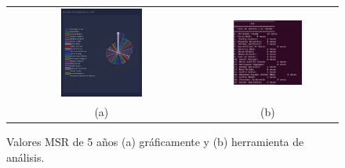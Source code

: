 \documentclass[a4paper, 12pt]{book}
\begin{document}
\begin{figure}[!h]
    \centering
    \begin{tabular}{cc}
    \includegraphics[width=0.45\textwidth]{img/msr_5_year_graph.png} &  
    \includegraphics[width=0.52\textwidth]{img/msr_5_year.png} \\ 
    (a) &(b) 
    \end{tabular}
    \caption{Valores MSR de 5 años (a) gráficamente y (b) herramienta de análisis.}
    \label{fig:comp_msr_5_year}
\end{figure}
\end{document}
